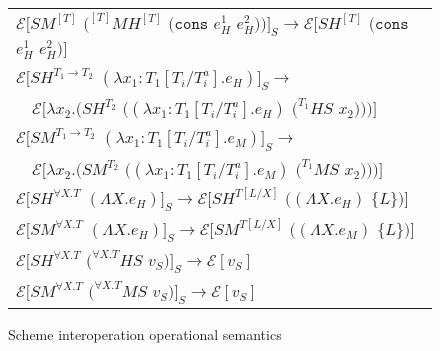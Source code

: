\begin{figure}[p]
\begin{tabular}{l}
\vspace{5pt}

$\mathscr{E}[SM^{[T]}$ $(^{[T]}MH^{[T]}$ $(\mathtt{cons}$ $e_{H}^{1}$ $e_{H}^{2}))]_{S}\rightarrow\mathscr{E}[SH^{[T]}$ $(\mathtt{cons}$ $e_{H}^{1}$ $e_{H}^{2})]$ \\

\vspace{5pt}

$\mathscr{E}[SH^{T_{1}\rightarrow T_{2}}$ $(\lambda x_{1}:T_{1}[T_{i}/T_{i}^{a}].e_{H})]_{S}\rightarrow$ \\

\vspace{5pt}

$\quad\mathscr{E}[\lambda x_{2}.(SH^{T_{2}}$ $((\lambda x_{1}:T_{1}[T_{i}/T_{i}^{a}].e_{H})$ $(^{T_{1}}HS$ $x_{2})))]$ \\

\vspace{5pt}

$\mathscr{E}[SM^{T_{1}\rightarrow T_{2}}$ $(\lambda x_{1}:T_{1}[T_{i}/T_{i}^{a}].e_{M})]_{S}\rightarrow$ \\

\vspace{5pt}

$\quad\mathscr{E}[\lambda x_{2}.(SM^{T_{2}}$ $((\lambda x_{1}:T_{1}[T_{i}/T_{i}^{a}].e_{M})$ $(^{T_{1}}MS$ $x_{2})))]$ \\

\vspace{5pt}

$\mathscr{E}[SH^{\forall X.T}$ $(\Lambda X.e_{H})]_{S}\rightarrow\mathscr{E}[SH^{T[L/X]}$ $((\Lambda X.e_{H})$ $\lbrace L\rbrace)]$ \\

\vspace{5pt}

$\mathscr{E}[SM^{\forall X.T}$ $(\Lambda X.e_{H})]_{S}\rightarrow\mathscr{E}[SM^{T[L/X]}$ $((\Lambda X.e_{M})$ $\lbrace L\rbrace)]$ \\

\vspace{5pt}

$\mathscr{E}[SH^{\forall X.T}$ $(^{\forall X.T}HS$ $v_{S})]_{S}\rightarrow\mathscr{E}[v_{S}]$ \\

\vspace{5pt}

$\mathscr{E}[SM^{\forall X.T}$ $(^{\forall X.T}MS$ $v_{S})]_{S}\rightarrow\mathscr{E}[v_{S}]$
\end{tabular}
\caption{Scheme interoperation operational semantics}
\label{isos}
\end{figure}